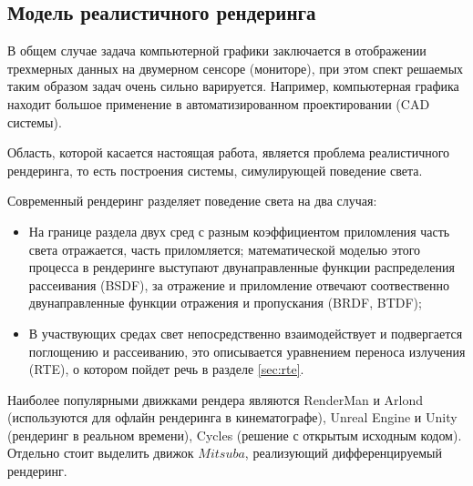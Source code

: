 \subsection{Модель реалистичного рендеринга}

В общем случае задача компьютерной графики заключается в отображении трехмерных данных на двумерном сенсоре (мониторе), при этом спект решаемых таким образом задач очень сильно варируется. Например, компьютерная графика находит большое применение в автоматизированном проектировании (CAD системы).

Область, которой касается настоящая работа, является проблема реалистичного рендеринга, то есть построения системы, симулирующей поведение света.

Современный рендеринг разделяет поведение света на два случая:
\begin{itemize}
	\item На границе раздела двух сред с разным коэффициентом приломления часть света отражается, часть приломляется; математической моделью этого процесса в рендеринге выступают двунаправленные функции распределения рассеивания (BSDF), за отражение и приломление отвечают соотвественно двунаправленные функции отражения и пропускания (BRDF, BTDF);
	\item В участвующих средах свет непосредственно взаимодействует и подвергается поглощению и рассеиванию, это описывается уравнением переноса излучения (RTE), о котором пойдет речь в разделе \ref{sec:rte}.
\end{itemize}

Наиболее популярными движками рендера являются RenderMan и Arlond (используются для офлайн рендеринга в кинематографе), Unreal Engine и Unity (рендеринг в реальном времени), Cycles (решение с открытым исходным кодом). Отдельно стоит выделить движок $Mitsuba$, реализующий дифференцируемый рендеринг.